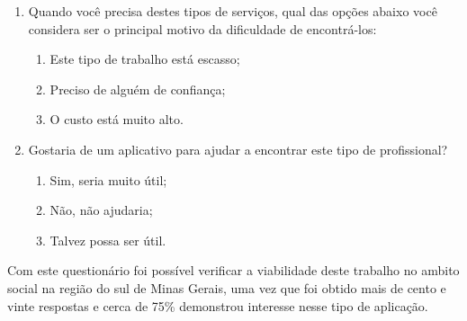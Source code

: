 \begin{enumerate}
	\item Quando você precisa destes tipos de serviços, qual das opções abaixo você considera ser o principal motivo da dificuldade de encontrá-los:
	\begin{enumerate}[label=(\alph*)]
		\item Este tipo de trabalho está escasso;
		\item Preciso de alguém de confiança;
		\item O custo está muito alto.
	\end{enumerate}
	
	\item Gostaria de um aplicativo para ajudar a encontrar este tipo de profissional?
	\begin{enumerate}[label=(\alph*)]
		\item Sim, seria muito útil;
		\item Não, não ajudaria;
		\item Talvez possa ser útil.
	\end{enumerate}	
\end{enumerate}


Com este questionário foi possível verificar a viabilidade deste trabalho no ambito social na região do sul de Minas Gerais, uma vez que foi obtido mais de cento e vinte respostas e cerca de 75\% demonstrou interesse nesse tipo de aplicação. 
